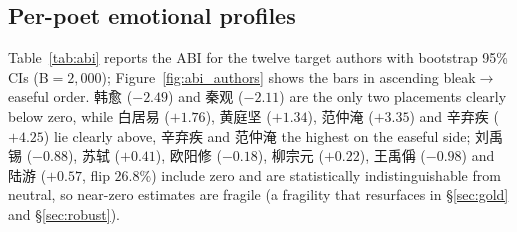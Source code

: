 \documentclass[10pt]{article}
\begin{document}
\subsection{Per-poet emotional profiles}
\label{sec:profiles:poets}
Table~\ref{tab:abi} reports the ABI for the twelve target authors with bootstrap 95\% CIs (B$=2{,}000$); Figure~\ref{fig:abi_authors} shows the bars in ascending bleak$\to$easeful order. 韩愈 ($-2.49$) and 秦观 ($-2.11$) are the only two placements clearly below zero, while 白居易 ($+1.76$), 黄庭坚 ($+1.34$), 范仲淹 ($+3.35$) and 辛弃疾 ($+4.25$) lie clearly above, 辛弃疾 and 范仲淹 the highest on the easeful side; 刘禹锡 ($-0.88$), 苏轼 ($+0.41$), 欧阳修 ($-0.18$), 柳宗元 ($+0.22$), 王禹偁 ($-0.98$) and 陆游 ($+0.57$, flip $26.8\%$) include zero and are statistically indistinguishable from neutral, so near-zero estimates are fragile (a fragility that resurfaces in \S\ref{sec:gold} and \S\ref{sec:robust}).
\end{document}
